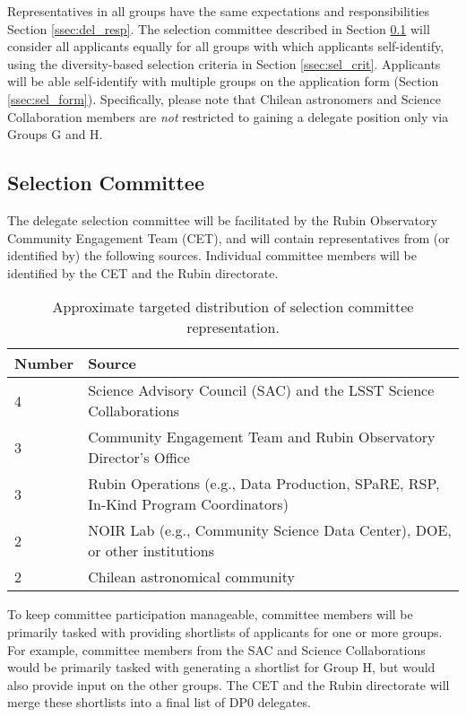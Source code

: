 \documentclass[DM,lsstdraft,authoryear,toc]{lsstdoc}
\begin{document}
Representatives in all groups have the same expectations and responsibilities Section \ref{ssec:del_resp}.
The selection committee described in Section \ref{ssec:sel_comm} will consider all applicants equally for all groups with which applicants self-identify, using the diversity-based selection criteria in Section \ref{ssec:sel_crit}.
Applicants will be able self-identify with multiple groups on the application form (Section \ref{ssec:sel_form}).
Specifically, please note that Chilean astronomers and Science Collaboration members are {\it not} restricted to gaining a delegate position only via Groups G and H.

\subsection{Selection Committee}\label{ssec:sel_comm}

The delegate selection committee will be facilitated by the Rubin Observatory Community Engagement Team (CET), and will contain representatives from (or identified by) the following sources.
Individual committee members will be identified by the CET and the Rubin directorate.

\begin{table}[!h]
\centering
\caption{Approximate targeted distribution of selection committee representation.}\label{tab:selection_committee}
\begin{tabular}{ll}
\hline
Number & Source \\
\hline \hline
4 & Science Advisory Council (SAC) and the LSST Science Collaborations \\
3 & Community Engagement Team and Rubin Observatory Director's Office \\
3 & Rubin Operations (e.g., Data Production, SPaRE, RSP, In-Kind Program Coordinators) \\
2 & NOIR Lab (e.g., Community Science Data Center), DOE, or other institutions \\
2 & Chilean astronomical community \\
\hline
\end{tabular}
\end{table}

To keep committee participation manageable, committee members will be primarily tasked with providing shortlists of applicants for one or more groups.
For example, committee members from the SAC and Science Collaborations would be primarily tasked with generating a shortlist for Group H, but would also provide input on the other groups.
The CET and the Rubin directorate will merge these shortlists into a final list of DP0 delegates.
\end{document}
